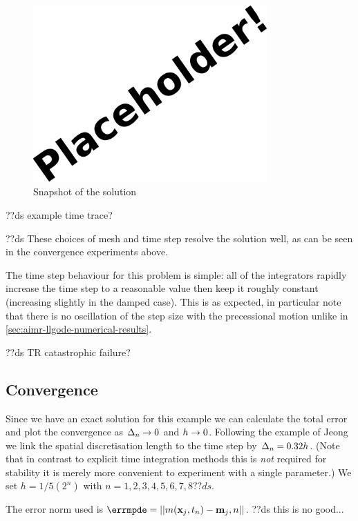 \begin{figure}
  \centering
  \includegraphics[width=0.8\textwidth]{images/placeholder}
  \caption{Snapshot of the solution}
  \label{fig:2d-wave-snapshot}
\end{figure}


??ds example time trace?

??ds These choices of mesh and time step resolve the solution well, as can be seen in the convergence experiments above.

The time step behaviour for this problem is simple: all of the integrators rapidly increase the time step to a reasonable value then keep it roughly constant (increasing slightly in the damped case).
This is as expected, in particular note that there is no oscillation of the step size with the precessional motion unlike in \cref{sec:aimr-llgode-numerical-results}.


??ds TR catastrophic failure?


\subsection{Convergence}

Since we have an exact solution for this example we can calculate the total error and plot the convergence as $\Delta_{n} \rightarrow 0$ and $h \rightarrow 0$.
Following the example of Jeong \etal \cite{Jeong2014} we link the spatial discretisation length to the time step by $\Delta_{n} = 0.32h$. (Note that in contrast to explicit time integration methods this is \emph{not} required for stability it is merely more convenient to experiment with a single parameter.)
We set $h = 1/5(2^n)$ with $n=1,2,3,4,5,6,7,8 ??ds$.

The error norm used is $\errmpde = \norm{m(\xv_j, t_n) - \mv_j,n}$. ??ds this is no good...

